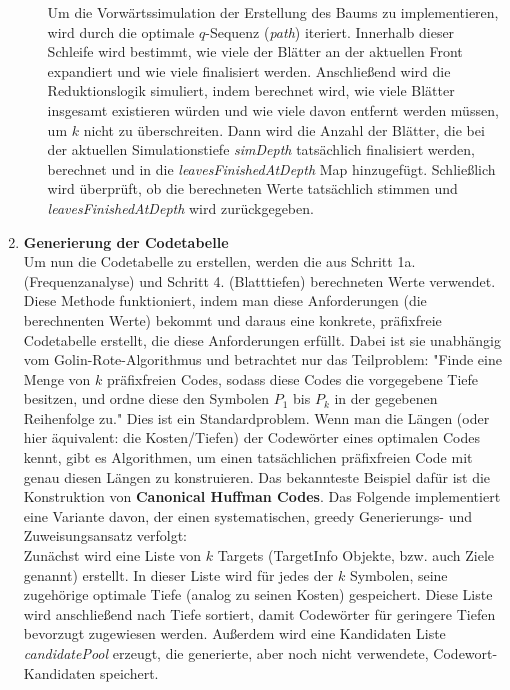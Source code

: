 \documentclass[a4paper,10pt,ngerman]{scrartcl}
\begin{document}
\begin{enumerate}
\begin{enumerate}
    Um die Vorwärtssimulation der Erstellung des Baums zu implementieren, wird durch die optimale $q$-Sequenz (\textit{path}) iteriert. Innerhalb dieser Schleife wird bestimmt, wie viele der Blätter an der aktuellen Front expandiert und wie viele finalisiert werden. Anschließend wird die Reduktionslogik simuliert, indem berechnet wird, wie viele Blätter insgesamt existieren würden und wie viele davon entfernt werden müssen, um $k$ nicht zu überschreiten. Dann wird die Anzahl der Blätter, die bei der aktuellen Simulationstiefe \textit{simDepth} tatsächlich finalisiert werden, berechnet und in die \textit{leavesFinishedAtDepth} Map hinzugefügt. Schließlich wird überprüft, ob die berechneten Werte tatsächlich stimmen und \textit{leavesFinishedAtDepth} wird zurückgegeben.  
  \end{enumerate}
  \item \textbf{Generierung der Codetabelle}\\
  Um nun die Codetabelle zu erstellen, werden die aus Schritt 1a. (Frequenzanalyse) und Schritt 4. (Blatttiefen) berechneten Werte verwendet. Diese Methode funktioniert, indem man diese Anforderungen (die berechnenten Werte) bekommt und daraus eine konkrete, präfixfreie Codetabelle erstellt, die diese Anforderungen erfüllt. Dabei ist sie unabhängig vom Golin-Rote-Algorithmus und betrachtet nur das Teilproblem: "Finde eine Menge von $k$ präfixfreien Codes, sodass diese Codes die vorgegebene Tiefe besitzen, und ordne diese den Symbolen $P_1$ bis $P_k$ in der gegebenen Reihenfolge zu." Dies ist ein Standardproblem. Wenn man die Längen (oder hier äquivalent: die Kosten/Tiefen) der Codewörter eines optimalen Codes kennt, gibt es Algorithmen, um einen tatsächlichen präfixfreien Code mit genau diesen Längen zu konstruieren. Das bekannteste Beispiel dafür ist die Konstruktion von \textbf{Canonical Huffman Codes}. Das Folgende implementiert eine Variante davon, der einen systematischen, greedy Generierungs- und Zuweisungsansatz verfolgt: 
  \\\newline
  Zunächst wird eine Liste von $k$ Targets (TargetInfo Objekte, bzw. auch Ziele genannt) erstellt. In dieser Liste wird für jedes der $k$ Symbolen, seine zugehörige optimale Tiefe (analog zu seinen Kosten) gespeichert. Diese Liste wird anschließend nach Tiefe sortiert, damit Codewörter für geringere Tiefen bevorzugt zugewiesen werden. Außerdem wird eine Kandidaten Liste \textit{candidatePool} erzeugt, die generierte, aber noch nicht verwendete, Codewort-Kandidaten speichert. \\

\end{enumerate}
\end{document}
